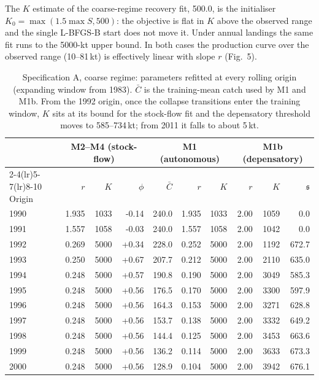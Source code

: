 \documentclass[preprint,11pt,authoryear]{elsarticle}
\theoremstyle{remark}
\newcommand{\sA}{\mathfrak{s}}
\begin{document}
The $K$ estimate of the coarse-regime recovery fit, 500.0, is the initialiser $K_0 = \max(1.5\max S, 500)$: the objective is flat in $K$ above the observed range and the single L-BFGS-B start does not move it. Under annual landings the same fit runs to the 5000-kt upper bound. In both cases the production curve over the observed range (10--81\,kt) is effectively linear with slope $r$ (Fig.~5).

\begin{table}[!htb]
\centering\scriptsize
\setlength{\tabcolsep}{4pt}
\caption{Specification A, coarse regime: parameters refitted at every rolling origin (expanding window from 1983). $\bar C$ is the training-mean catch used by M1 and M1b. From the 1992 origin, once the collapse transitions enter the training window, $K$ sits at its bound for the stock-flow fit and the depensatory threshold moves to 585--734\,kt; from 2011 it falls to about 5\,kt.}
\label{tab:si_rollingA}
\begin{tabular}{@{}lrrrrrrrrr@{}}
\toprule
 & \multicolumn{3}{c}{M2--M4 (stock-flow)} & \multicolumn{3}{c}{M1 (autonomous)} & \multicolumn{3}{c}{M1b (depensatory)} \\
\cmidrule(lr){2-4}\cmidrule(lr){5-7}\cmidrule(lr){8-10}
Origin & $r$ & $K$ & $\phi$ & $\bar C$ & $r$ & $K$ & $r$ & $K$ & $\sA$ \\
\midrule
1990 & 1.935 & 1033 & -0.14 & 240.0 & 1.935 & 1033 & 2.00 & 1059 & 0.0 \\
1991 & 1.557 & 1058 & -0.03 & 240.0 & 1.557 & 1058 & 2.00 & 1042 & 0.0 \\
1992 & 0.269 & 5000 & +0.34 & 228.0 & 0.252 & 5000 & 2.00 & 1192 & 672.7 \\
1993 & 0.250 & 5000 & +0.67 & 207.7 & 0.212 & 5000 & 2.00 & 2110 & 635.0 \\
1994 & 0.248 & 5000 & +0.57 & 190.8 & 0.190 & 5000 & 2.00 & 3049 & 585.3 \\
1995 & 0.248 & 5000 & +0.56 & 176.5 & 0.170 & 5000 & 2.00 & 3300 & 597.9 \\
1996 & 0.248 & 5000 & +0.56 & 164.3 & 0.153 & 5000 & 2.00 & 3271 & 628.8 \\
1997 & 0.248 & 5000 & +0.56 & 153.7 & 0.138 & 5000 & 2.00 & 3332 & 649.2 \\
1998 & 0.248 & 5000 & +0.56 & 144.4 & 0.125 & 5000 & 2.00 & 3453 & 663.6 \\
1999 & 0.248 & 5000 & +0.56 & 136.2 & 0.114 & 5000 & 2.00 & 3633 & 673.3 \\
2000 & 0.248 & 5000 & +0.56 & 128.9 & 0.104 & 5000 & 2.00 & 3942 & 676.1 \\

\end{tabular}
\end{table}
\end{document}
